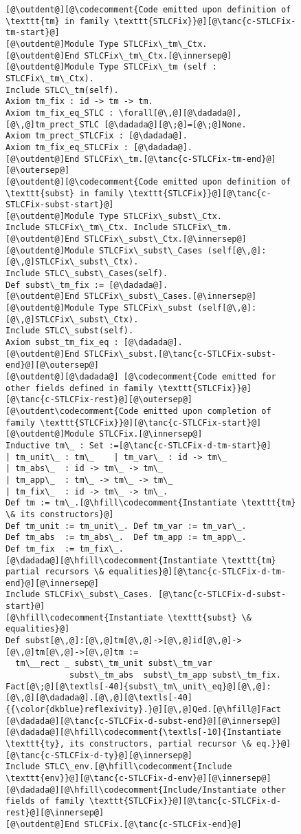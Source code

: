 \begin{figure}
\begin{minipage}{\textwidth}
\begin{multicols}{2}
\begin{lstlisting}
[@\outdent@][@\codecomment{Code emitted upon definition of \texttt{tm} in family \texttt{STLCFix}}@][@\tanc{c-STLCFix-tm-start}@]
[@\outdent@]Module Type STLCFix\_tm\_Ctx.
[@\outdent@]End STLCFix\_tm\_Ctx.[@\innersep@]
[@\outdent@]Module Type STLCFix\_tm (self : STLCFix\_tm\_Ctx).
Include STLC\_tm(self).
Axiom tm_fix : id -> tm -> tm.
Axiom tm_fix_eq_STLC : \forall[@\,@][@\dadada@],[@\,@]tm_prect_STLC [@\dadada@][@\;@]=[@\;@]None.
Axiom tm_prect_STLCFix : [@\dadada@].
Axiom tm_fix_eq_STLCFix : [@\dadada@].
[@\outdent@]End STLCFix\_tm.[@\tanc{c-STLCFix-tm-end}@][@\outersep@]
[@\outdent@][@\codecomment{Code emitted upon definition of \texttt{subst} in family \texttt{STLCFix}}@][@\tanc{c-STLCFix-subst-start}@]
[@\outdent@]Module Type STLCFix\_subst\_Ctx.
Include STLCFix\_tm\_Ctx. Include STLCFix\_tm.
[@\outdent@]End STLCFix\_subst\_Ctx.[@\innersep@]
[@\outdent@]Module STLCFix\_subst\_Cases (self[@\,@]:[@\,@]STLCFix\_subst\_Ctx).
Include STLC\_subst\_Cases(self).
Def subst\_tm_fix := [@\dadada@].
[@\outdent@]End STLCFix\_subst\_Cases.[@\innersep@]
[@\outdent@]Module Type STLCFix\_subst (self[@\,@]:[@\,@]STLCFix\_subst\_Ctx).
Include STLC\_subst(self).
Axiom subst_tm_fix_eq : [@\dadada@].
[@\outdent@]End STLCFix\_subst.[@\tanc{c-STLCFix-subst-end}@][@\outersep@]
[@\outdent@][@\dadada@] [@\codecomment{Code emitted for other fields defined in family \texttt{STLCFix}}@][@\tanc{c-STLCFix-rest}@][@\outersep@]
[@\outdent\codecomment{Code emitted upon completion of family \texttt{STLCFix}}@][@\tanc{c-STLCFix-start}@]
[@\outdent@]Module STLCFix.[@\innersep@]
Inductive tm\_ : Set :=[@\tanc{c-STLCFix-d-tm-start}@]
| tm_unit\_ : tm\_    | tm_var\_ : id -> tm\_
| tm_abs\_  : id -> tm\_ -> tm\_
| tm_app\_  : tm\_ -> tm\_ -> tm\_
| tm_fix\_  : id -> tm\_ -> tm\_.
Def tm := tm\_.[@\hfill\codecomment{Instantiate \texttt{tm} \& its constructors}@]
Def tm_unit := tm_unit\_. Def tm_var := tm_var\_.
Def tm_abs  := tm_abs\_.  Def tm_app := tm_app\_.
Def tm_fix  := tm_fix\_.
[@\dadada@][@\hfill\codecomment{Instantiate \texttt{tm} partial recursors \& equalities}@][@\tanc{c-STLCFix-d-tm-end}@][@\innersep@]
Include STLCFix\_subst\_Cases. [@\tanc{c-STLCFix-d-subst-start}@]
[@\hfill\codecomment{Instantiate \texttt{subst} \& equalities}@]
Def subst[@\,@]:[@\,@]tm[@\,@]->[@\,@]id[@\,@]->[@\,@]tm[@\,@]->[@\,@]tm :=
  tm\__rect _ subst\_tm_unit subst\_tm_var
             subst\_tm_abs  subst\_tm_app subst\_tm_fix.
Fact[@\;@][@\textls[-40]{subst\_tm\_unit\_eq}@][@\,@]:[@\,@][@\dadada@].[@\,@][@\textls[-40]{{\color{dkblue}reflexivity}.}@][@\,@]Qed.[@\hfill@]Fact [@\dadada@][@\tanc{c-STLCFix-d-subst-end}@][@\innersep@]
[@\dadada@][@\hfill\codecomment{\textls[-10]{Instantiate \texttt{ty}, its constructors, partial recursor \& eq.}}@][@\tanc{c-STLCFix-d-ty}@][@\innersep@]
Include STLC\_env.[@\hfill\codecomment{Include \texttt{env}}@][@\tanc{c-STLCFix-d-env}@][@\innersep@]
[@\dadada@][@\hfill\codecomment{Include/Instantiate other fields of family \texttt{STLCFix}}@][@\tanc{c-STLCFix-d-rest}@][@\innersep@]
[@\outdent@]End STLCFix.[@\tanc{c-STLCFix-end}@]
\end{lstlisting}


\end{multicols}
\end{minipage}
\end{figure}
